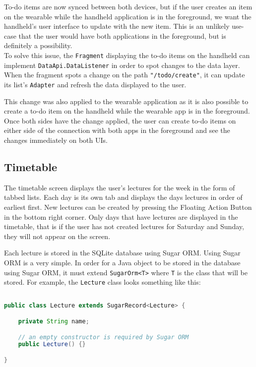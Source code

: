 To-do items are now synced between both devices, but if the user creates an
item on the wearable while the handheld application is in the foreground, we
want the handheld's user interface to update with the new item. This is an
unlikely use-case that the user would have both applications in the foreground,
but is definitely a possibility.\\
To solve this issue, the \texttt{Fragment} displaying the to-do items on the
handheld can implement \texttt{DataApi.DataListener} in order to spot changes
to the data layer. When the fragment spots a change on the path 
\texttt{"/todo/create"}, it can update its list's \texttt{Adapter} and refresh
the data displayed to the user.

This change was also applied to the wearable application as it is also possible
to create a to-do item on the handheld while the wearable app is in the
foreground. Once both sides have the change applied, the user can create to-do
items on either side of the connection with both apps in the foreground and see
the changes immediately on both UIs.

\subsection{Timetable}

The timetable screen displays the user's lectures for the week in the form of
tabbed lists. Each day is its own tab and displays the days lectures in order
of earliest first. New lectures can be created by pressing the Floating Action
Button in the bottom right corner. Only days that have lectures are displayed in
the timetable, that is if the user has not created lectures for Saturday and
Sunday, they will not appear on the screen.

Each lecture is stored in the SQLite database using Sugar ORM. Using Sugar ORM
is a very simple. In order for a Java object to be stored in the database using
Sugar ORM, it must extend \texttt{SugarOrm<T>} where \texttt{T} is the class
that will be stored. For example, the \texttt{Lecture} class looks something
like this:

\begin{lstlisting}[language=Java]

public class Lecture extends SugarRecord<Lecture> {

    private String name;

    // an empty constructor is required by Sugar ORM
    public Lecture() {}

}

\end{lstlisting}

